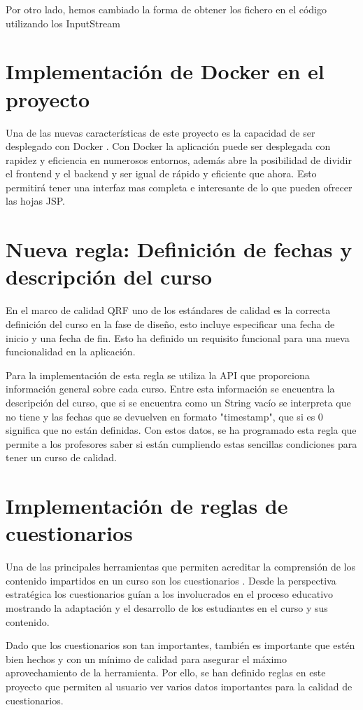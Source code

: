Por otro lado, hemos cambiado la forma de obtener los fichero en el código utilizando los InputStream\cite{inputstream}

\section{Implementación de Docker en el proyecto}
Una de las nuevas características de este proyecto es la capacidad de  ser desplegado con Docker \cite{docker}. Con Docker la aplicación puede ser desplegada con rapidez y eficiencia en numerosos entornos, además abre la posibilidad de dividir el frontend y el backend y ser igual de rápido y eficiente que ahora. Esto permitirá tener una interfaz mas completa e interesante de lo que pueden ofrecer las hojas JSP.

\section{Nueva regla: Definición de fechas y descripción del curso}
En el marco de calidad QRF \cite{quality-reference-framework} uno de los estándares de calidad es la correcta definición del curso en la fase de diseño, esto incluye especificar una fecha de inicio y una fecha de fin. Esto ha definido un requisito funcional para una nueva funcionalidad en la aplicación.

Para la implementación de esta regla se utiliza la API que proporciona información general sobre cada curso. Entre esta información se encuentra la descripción del curso, que si se encuentra como un String vacío se interpreta que no tiene y las fechas que se devuelven en formato "timestamp", que si es 0 significa que no están definidas. Con estos datos, se ha programado esta regla que permite a los profesores saber si están cumpliendo estas sencillas condiciones para tener un curso de calidad.

\section{Implementación de reglas de cuestionarios}
Una de las principales herramientas que permiten acreditar la comprensión de los contenido impartidos en un curso son los cuestionarios \cite{evaluacion-de-educacion-virtual}. Desde la perspectiva estratégica los cuestionarios guían a los involucrados en el proceso educativo mostrando la adaptación y el desarrollo de los estudiantes en el curso y sus contenido.

Dado que los cuestionarios son tan importantes, también es importante que estén bien hechos y con un mínimo de calidad para asegurar el máximo aprovechamiento de la herramienta. Por ello, se han definido reglas en este proyecto que permiten al usuario ver varios datos importantes para la calidad de cuestionarios.

